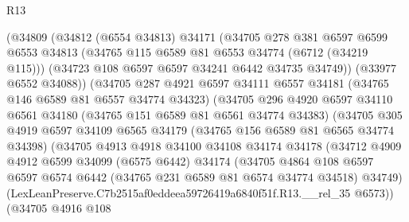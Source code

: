 \begin{lexlean}{R13}
\begin{coremodule}
                    (@34809
                      (@34812
                        (@6554 @34813)
                        @34171
                        (@34705
                          @278
                          @381
                          @6597
                          @6599
                          @6553
                          @34813
                          (@34765 @115 @6589 @81 @6553 @34774 (@6712 (@34219 @115)))
                          (@34723 @108 @6597 @6597 @34241 @6442 @34735 @34749))
                        (@33977 @6552 @34088))
                      (@34705
                        @287
                        @4921
                        @6597
                        @34111
                        @6557
                        @34181
                        (@34765 @146 @6589 @81 @6557 @34774 @34323)
                        (@34705
                          @296
                          @4920
                          @6597
                          @34110
                          @6561
                          @34180
                          (@34765 @151 @6589 @81 @6561 @34774 @34383)
                          (@34705
                            @305
                            @4919
                            @6597
                            @34109
                            @6565
                            @34179
                            (@34765 @156 @6589 @81 @6565 @34774 @34398)
                            (@34705
                              @4913
                              @4918
                              @34100
                              @34108
                              @34174
                              @34178
                              (@34712
                                @4909
                                @4912
                                @6599
                                @34099
                                (@6575 @6442)
                                @34174
                                (@34705
                                  @4864
                                  @108
                                  @6597
                                  @6597
                                  @6574
                                  @6442
                                  (@34765 @231 @6589 @81 @6574 @34774 @34518)
                                  @34749)
                                (LexLeanPreserve.C7b2515af0eddeea59726419a6840f51f.R13.__rel_35
                                  @6573))
                              (@34705
                                @4916
                                @108

\end{coremodule}
\end{lexlean}

